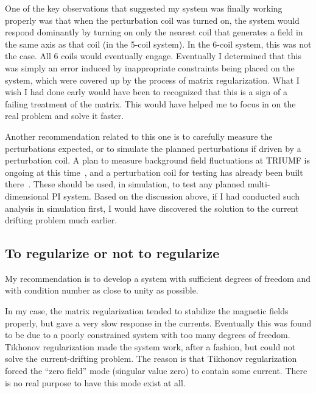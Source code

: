 One of the key observations that suggested my system was finally working properly was that when the perturbation coil was turned on, the system would respond dominantly by turning on only the nearest coil that generates a field in the same axis as that coil (in the 5-coil system). In the 6-coil system, this was not the case.  All 6 coils would eventually engage.  Eventually I determined that this was simply an error induced by inappropriate constraints being placed on the system, which were covered up by the process of matrix regularization. What I wish I had done early would have been to recognized that this is a sign of a failing treatment of the matrix.  This would have helped me to focus in on the real problem and solve it faster.

Another recommendation related to this one is to carefully measure the perturbations expected, or to simulate the planned perturbations if driven by a perturbation coil. A plan to measure background field fluctuations at TRIUMF is ongoing at this time~\cite{beapriv}, and a perturbation coil for testing has already been built there~\cite{smith,cudmore}. These should be used, in simulation, to test any planned multi-dimensional PI system.  Based on the discussion above, if I had conducted such analysis in simulation first, I would have discovered the solution to the current drifting problem much earlier.

\subsection{To regularize or not to regularize}
 
My recommendation is to develop a system with sufficient degrees of freedom and with condition number as close to unity as possible. 

In my case, the matrix regularization tended to stabilize the magnetic fields properly, but gave a very slow response in the currents. Eventually this was found to be due to a poorly constrained system with too many degrees of freedom. Tikhonov regularization made the system work, after a fashion, but could not solve the current-drifting problem. The reason is that Tikhonov regularization forced the ``zero field'' mode (singular value zero) to contain some current. There is no real purpose to have this mode exist at all.

